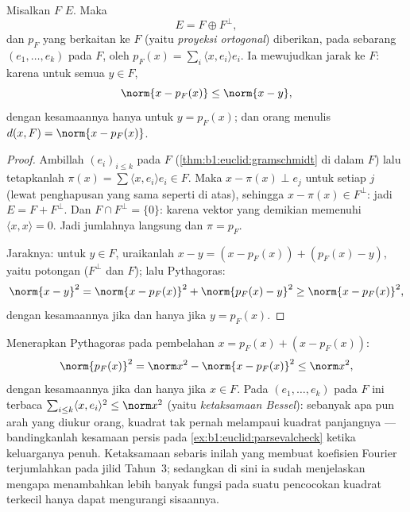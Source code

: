\begin{theorem}\label{thm:b1:euclid:projection}
Misalkan $F$   $E$. Maka
\[
E = F \oplus F^{\perp},
\]
dan  $p_F$ yang berkaitan ke $F$ (yaitu \emph{proyeksi
ortogonal}) diberikan, pada sebarang
  $(e_1, \dots, e_k)$ pada $F$, oleh $p_F(x) = \sum_i
\langle x, e_i\rangle e_i$. Ia mewujudkan jarak ke $F$:
karena untuk semua $y \in F$,
\[
\norm{x - p_F(x)} \leq \norm{x - y},
\]
dengan kesamaannya hanya untuk $y = p_F(x)$; dan orang menulis $d(x, F) = \norm{x -
p_F(x)}$.
\end{theorem}

\begin{proof}
Ambillah   $(e_i)_{i \leq k}$ pada $F$
(\cref{thm:b1:euclid:gramschmidt} di dalam $F$) lalu tetapkanlah $\pi(x) =
\sum \langle x, e_i\rangle e_i \in F$. Maka $x - \pi(x) \perp e_j$
untuk setiap $j$ (lewat penghapusan yang sama seperti di atas), sehingga $x - \pi(x) \in
F^\perp$: jadi $E = F + F^\perp$. Dan $F \cap F^\perp = \{0\}$: karena
vektor yang demikian memenuhi $\langle x, x\rangle = 0$. Jadi jumlahnya langsung dan
$\pi = p_F$.

Jaraknya: untuk $y \in F$, uraikanlah $x - y = (x - p_F(x)) + (p_F(x) -
y)$, yaitu potongan  ($F^\perp$ dan $F$); lalu Pythagoras:
\[
\norm{x - y}^2 = \norm{x - p_F(x)}^2 + \norm{p_F(x) - y}^2
\geq \norm{x - p_F(x)}^2,
\]
dengan kesamaannya jika dan hanya jika $y = p_F(x)$.
\end{proof}

\begin{example}
\label{ex:b1:euclid:bessel}
Menerapkan Pythagoras pada pembelahan $x = p_F(x) + (x - p_F(x))$:
\[
\norm{p_F(x)}^2 = \norm x^2 - \norm{x - p_F(x)}^2 \leq
\norm x^2 ,
\]
dengan kesamaannya jika dan hanya jika $x \in F$. Pada   $(e_1,
\dots, e_k)$ pada $F$ ini terbaca $\sum_{i \leq k}\langle x,
e_i\rangle^2 \leq \norm x^2$ (yaitu \emph{ketaksamaan Bessel}):
sebanyak apa pun arah  yang diukur orang, kuadrat
 tak pernah melampaui kuadrat panjangnya --- bandingkanlah
kesamaan persis pada \cref{ex:b1:euclid:parsevalcheck} ketika
keluarganya  penuh. Ketaksamaan sebaris inilah yang membuat
koefisien Fourier terjumlahkan pada jilid Tahun~3; sedangkan di sini ia
sudah menjelaskan mengapa menambahkan lebih banyak fungsi  pada suatu
pencocokan kuadrat terkecil hanya dapat mengurangi sisaannya.
\end{example}

